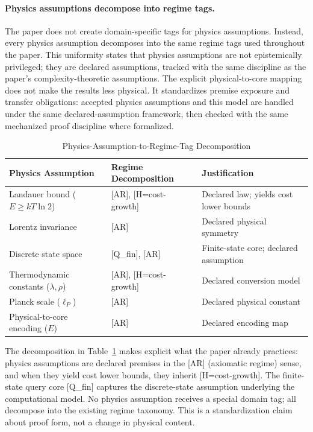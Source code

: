\paragraph{Physics assumptions decompose into regime tags.}
The paper does not create domain-specific tags for physics assumptions. Instead, every physics assumption decomposes into the same regime tags used throughout the paper. This uniformity states that physics assumptions are not epistemically privileged; they are declared assumptions, tracked with the same discipline as the paper's complexity-theoretic assumptions.
The explicit physical-to-core mapping does not make the results less physical. It standardizes premise exposure and transfer obligations: accepted physics assumptions and this model are handled under the same declared-assumption framework, then checked with the same mechanized proof discipline where formalized.

\begin{table}[htbp]
\centering
\caption{Physics-Assumption-to-Regime-Tag Decomposition}
\label{tab:physics-regime-decomposition}
\begin{tabular}{@{}lll@{}}
\toprule
\textbf{Physics Assumption} & \textbf{Regime Decomposition} & \textbf{Justification} \\
\midrule
Landauer bound ($E \ge kT\ln 2$) & [AR], [H=cost-growth] & Declared law; yields cost lower bounds \\
Lorentz invariance & [AR] & Declared physical symmetry \\
Discrete state space & [Q\_fin], [AR] & Finite-state core; declared assumption \\
Thermodynamic constants ($\lambda, \rho$) & [AR], [H=cost-growth] & Declared conversion model \\
Planck scale ($\ell_P$) & [AR] & Declared physical constant \\
Physical-to-core encoding ($E$) & [AR] & Declared encoding map \\
\bottomrule
\end{tabular}
\end{table}

The decomposition in Table~\ref{tab:physics-regime-decomposition} makes explicit what the paper already practices: physics assumptions are declared premises in the [AR] (axiomatic regime) sense, and when they yield cost lower bounds, they inherit [H=cost-growth]. The finite-state query core [Q\_fin] captures the discrete-state assumption underlying the computational model. No physics assumption receives a special domain tag; all decompose into the existing regime taxonomy. This is a standardization claim about proof form, not a change in physical content.

